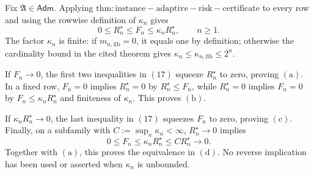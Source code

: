 Fix \(\mathfrak A\in\mathsf{Adm}\).  Applying \(\mathrm{thm:instance-adaptive-risk-certificate}\) to every row and using the rowwise definition of \(\kappa_n\) gives
\[
 0\le R_n^{\star}\le F_n\le\kappa_nR_n^{\star},
 \qquad n\ge1.                                                                    \tag{17}
\]
The factor \(\kappa_n\) is finite: if \(m_{n,\mathrm{fib}}=0\), it equals one by definition; otherwise the cardinality bound in the cited theorem gives \(\kappa_n\le\kappa_{n,\mathrm{fib}}\le2^n\).

If \(F_n\to0\), the first two inequalities in \((17)\) squeeze \(R_n^{\star}\) to zero, proving \(\mathrm{(a)}\).  In a fixed row, \(F_n=0\) implies \(R_n^{\star}=0\) by \(R_n^{\star}\le F_n\), while \(R_n^{\star}=0\) implies \(F_n=0\) by \(F_n\le\kappa_nR_n^{\star}\) and finiteness of \(\kappa_n\).  This proves \(\mathrm{(b)}\).

If \(\kappa_nR_n^{\star}\to0\), the last inequality in \((17)\) squeezes \(F_n\) to zero, proving \(\mathrm{(c)}\).  Finally, on a subfamily with \(C:=\sup_n\kappa_n<\infty\), \(R_n^{\star}\to0\) implies
\[
 0\le F_n\le\kappa_nR_n^{\star}\le C R_n^{\star}\longrightarrow0.
\]
Together with \(\mathrm{(a)}\), this proves the equivalence in \(\mathrm{(d)}\).  No reverse implication has been used or asserted when \(\kappa_n\) is unbounded.